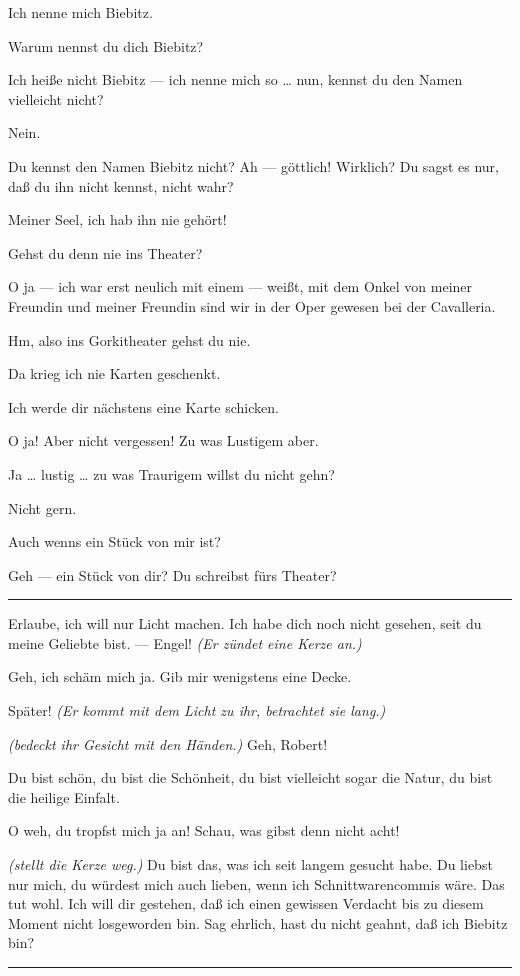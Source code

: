 \documentclass[
	final,
	a4paper,
	ngerman,
	mpinclude = true, %
	twoside = true,
	open = right,
	cleardoublepage = plain,
	DIV = 13,
	BCOR = 1cm,
	titlepage = firstiscover,
	]{scrbook}
\newcommand{\direction}[1]{\textit{(#1)}}
\newenvironment{deletion}{%
		\vspace{0.25\baselineskip}
		\hrule
		\vspace{0.25\baselineskip}
		\color{darkgray}
	}{
		\color{black}
		\vspace{0.25\baselineskip}
		\hrule 
		\vspace{0.25\baselineskip}
	}
\newcommand{\thecharacter}[1]{\textup{\textsc{#1}}\xspace}
\newcommand{\thesuesse}{\thecharacter{Lola}}
\newcommand{\thedichter}{\thecharacter{Robert Bibitz}}
\newcommand{\character}[1]{\item[#1:]}
\newcommand{\suesse}{\character{\thesuesse}}
\newcommand{\dichter}{\character{\thedichter}}
\begin{document}
\begin{play}
	\dichter
	Ich nenne mich Biebitz.

	\suesse
	Warum nennst du dich Biebitz?

	\dichter
	Ich heiße nicht Biebitz --- ich nenne mich so \ldots{} nun, kennst du den Namen vielleicht nicht?

	\suesse
	Nein.

	\dichter
	Du kennst den Namen Biebitz nicht? Ah --- göttlich! Wirklich? Du sagst es nur, daß du ihn nicht kennst, nicht wahr?

	\suesse
	Meiner Seel, ich hab ihn nie gehört!

	\dichter
	Gehst du denn nie ins Theater?

	\suesse
	O ja --- ich war erst neulich mit einem --- weißt, mit dem Onkel von meiner Freundin und meiner Freundin sind wir in der Oper gewesen bei der Cavalleria.

	\dichter
	Hm, also ins Gorkitheater gehst du nie.

	\suesse
	Da krieg ich nie Karten geschenkt.

	\dichter
	Ich werde dir nächstens eine Karte schicken.

	\suesse
	O ja! Aber nicht vergessen! Zu was Lustigem aber.

	\dichter
	Ja \ldots{} lustig \ldots{} zu was Traurigem willst du nicht gehn?

	\suesse
	Nicht gern.

	\dichter
	Auch wenns ein Stück von mir ist?

	\suesse
	Geh --- ein Stück von dir? Du schreibst fürs Theater?

	\begin{deletion}
	\dichter
	Erlaube, ich will nur Licht machen. Ich habe dich noch nicht gesehen, seit du meine Geliebte bist. --- Engel! \direction{Er zündet eine Kerze an.}

	\suesse
	Geh, ich schäm mich ja. Gib mir wenigstens eine Decke.

	\dichter
	Später! \direction{Er kommt mit dem Licht zu ihr, betrachtet sie lang.}

	\suesse
	\direction{bedeckt ihr Gesicht mit den Händen.} Geh, Robert!

	\dichter
	Du bist schön, du bist die Schönheit, du bist vielleicht sogar die Natur, du bist die heilige Einfalt.

	\suesse
	O weh, du tropfst mich ja an! Schau, was gibst denn nicht acht!

	\dichter
	\direction{stellt die Kerze weg.} Du bist das, was ich seit langem gesucht habe. Du liebst nur mich, du würdest mich auch lieben, wenn ich Schnittwarencommis wäre. Das tut wohl. Ich will dir gestehen, daß ich einen gewissen Verdacht bis zu diesem Moment nicht losgeworden bin. Sag ehrlich, hast du nicht geahnt, daß ich Biebitz bin?


\end{deletion}
\end{play}
\end{document}
